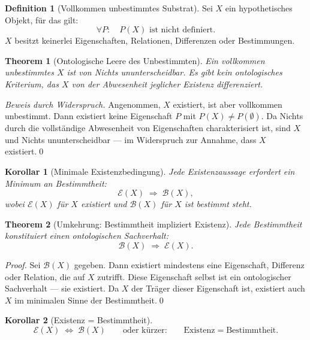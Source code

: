 \documentclass[11pt,a4paper]{article}
\theoremstyle{plain}
\newtheorem{theorem}{Theorem}[section]
\newtheorem{corollary}{Korollar}[section]
\theoremstyle{definition}
\newtheorem{definition}{Definition}[section]
\begin{document}
\begin{definition}[Vollkommen unbestimmtes Substrat]
Sei $X$ ein hypothetisches Objekt, f\"{u}r das gilt:
\[
  \forall P\colon \quad P(X) \text{ ist nicht definiert.}
\]
$X$ besitzt keinerlei Eigenschaften, Relationen, Differenzen oder
Bestimmungen.
\end{definition}

\begin{theorem}[Ontologische Leere des Unbestimmten]
Ein vollkommen unbestimmtes $X$ ist von \glqq{}Nichts\grqq{}
ununterscheidbar. Es gibt kein ontologisches Kriterium, das $X$ von der
Abwesenheit jeglicher Existenz differenziert.
\end{theorem}

\begin{proof}[Beweis durch Widerspruch]
Angenommen, $X$ existiert, ist aber vollkommen unbestimmt. Dann existiert
keine Eigenschaft $P$ mit $P(X) \neq P(\emptyset)$. Da \glqq{}Nichts\grqq{}
durch die vollst\"{a}ndige Abwesenheit von Eigenschaften charakterisiert
ist, sind $X$ und \glqq{}Nichts\grqq{} ununterscheidbar --- im Widerspruch
zur Annahme, dass $X$ existiert.\qed
\end{proof}

\begin{corollary}[Minimale Existenzbedingung]
Jede Existenzaussage erfordert ein Minimum an Bestimmtheit:
\[
  \mathcal{E}(X) \;\Rightarrow\; \mathcal{B}(X),
\]
wobei $\mathcal{E}(X)$ f\"{u}r \glqq{}$X$ existiert\grqq{} und
$\mathcal{B}(X)$ f\"{u}r \glqq{}$X$ ist bestimmt\grqq{} steht.
\end{corollary}

\begin{theorem}[Umkehrung: Bestimmtheit impliziert Existenz]
Jede Bestimmtheit konstituiert einen ontologischen Sachverhalt:
\[
  \mathcal{B}(X) \;\Rightarrow\; \mathcal{E}(X).
\]
\end{theorem}

\begin{proof}
Sei $\mathcal{B}(X)$ gegeben. Dann existiert mindestens eine Eigenschaft,
Differenz oder Relation, die auf $X$ zutrifft. Diese Eigenschaft selbst
ist ein ontologischer Sachverhalt --- sie existiert. Da $X$ der Tr\"{a}ger
dieser Eigenschaft ist, existiert auch $X$ im minimalen Sinne der
Bestimmtheit.\qed
\end{proof}

\begin{corollary}[Existenz = Bestimmtheit]
\[
  \boxed{\mathcal{E}(X) \;\Longleftrightarrow\; \mathcal{B}(X)}
  \qquad\text{oder k\"{u}rzer:}\qquad
  \boxed{\text{Existenz} = \text{Bestimmtheit}.}
\]
\end{corollary}
\end{document}
